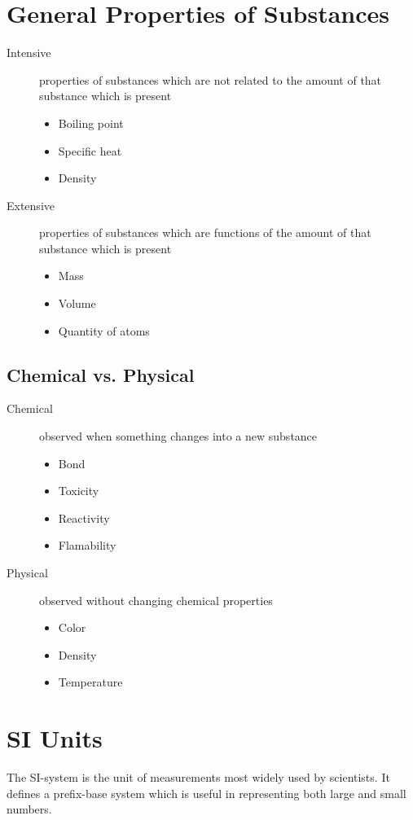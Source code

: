 \section{General Properties of Substances}
\begin{description}
  \item[Intensive] properties of substances which are not related to the amount
    of that substance which is present
    \begin{itemize}
      \item Boiling point
      \item Specific heat
      \item Density
    \end{itemize}
  \item[Extensive] properties of substances which are functions of the amount of
    that substance which is present
    \begin{itemize}
      \item Mass
      \item Volume
      \item Quantity of atoms
    \end{itemize}
\end{description}

\subsection{Chemical vs. Physical}
\begin{description}
  \item[Chemical] observed when something changes into a new substance
    \begin{itemize}
      \item Bond
      \item Toxicity
      \item Reactivity
      \item Flamability
    \end{itemize}
  \item[Physical] observed without changing chemical properties
    \begin{itemize}
      \item Color
      \item Density
      \item Temperature
    \end{itemize}
\end{description}

\section{SI Units}
The SI-system is the unit of measurements most widely used by scientists.  It
defines a prefix-base system which is useful in representing both large and
small numbers.

